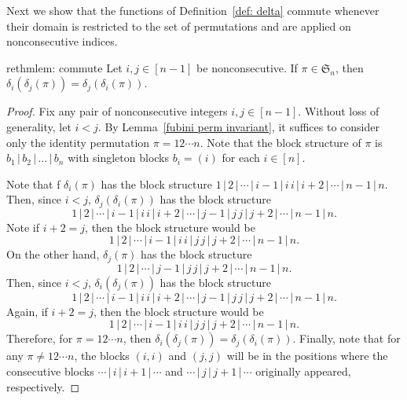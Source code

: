 \documentclass[11pt,reqno]{amsart}
\theoremstyle{definition}
\theoremstyle{notation}
\theoremstyle{openproblem}
\newcommand{\Sym}{\mathfrak{S}}
\begin{document}
Next we show that the functions of Definition~\ref{def: delta} commute whenever their domain is restricted to the set of permutations and are applied on nonconsecutive indices.
\begin{restatable}{rethm}{lem: commute}
\label{lem: commute}
Let  $i , j \in [n-1]$ be nonconsecutive. If $\pi \in \Sym_n$, then $\delta_i(\delta_j(\pi)) = \delta_j(\delta_i(\pi))$.
\end{restatable}
\begin{proof}
Fix any pair of nonconsecutive integers $i, j \in [n-1]$. 
Without loss of generality, let $i<j$.
By Lemma~\ref{fubini perm invariant}, it suffices to consider only the identity permutation $\pi = 12\cdots n$. 
Note that the block structure of $\pi$ is $b_1 \,|\, b_2 \,|\, \ldots \,|\, b_n$ with singleton blocks $b_i = (i)$ for each $i \in [n]$.

Note that f $\delta_i(\pi)$ has the block structure $1\,|\,2\,|\,\cdots\,|\,i-1\,|\,i\,i\,|\,i+2\,|\,\cdots\,|\,n-1\,|\,n$. 
Then, since $i < j$, $\delta_j(\delta_i(\pi))$ has the block structure
\[
1\,|\,2\,|\,\cdots\,|\,i-1\,|\,i\,i\,|\,i+2\,|\,\cdots\,|\,j-1\,|\,j\,j\,|\,j+2\,|\,\cdots\,|\,n-1\,|\,n.
\] 
Note if $i+2=j$, then the block structure would be
\[
1\,|\,2\,|\,\cdots\,|\,i-1\,|\,i\,i\,|\,j\,j\,|\,j+2\,|\,\cdots\,|\,n-1\,|\,n.
\]
On the other hand, 
$\delta_j(\pi)$ has the block structure \[1\,|\,2\,|\,\cdots\,|\,j-1\,|\,j\,j\,|\,j+2\,|\,\cdots\,|\,n-1\,|\,n.\] 
Then, since $i < j$, $\delta_i(\delta_j(\pi))$ has the block structure \[1\,|\,2\,|\,\cdots\,|\,i-1\,|\,i\,i\,|\,i+2\,|\,\cdots\,|\,j-1\,|\,j\,j\,|\,j+2\,|\,\cdots\,|\,n-1\,|\,n.\] 
Again, if $i+2=j$, then the block structure would be
\[1\,|\,2\,|\,\cdots\,|\,i-1\,|\,i\,i\,|\,j\,j\,|\,j+2\,|\,\cdots\,|\,n-1\,|\,n.\]
Therefore, for $\pi = 12\cdots n$, then $\delta_i(\delta_j(\pi)) = \delta_j(\delta_i(\pi))$. 
Finally, note that for any $\pi \neq 12\cdots n$, the blocks $(i,i)$ and $(j,j)$ will be in the positions where the consecutive blocks $\cdots\,|\,i\,|\,i+1\,|\,\cdots$ and $\cdots\,|\,j\,|\,j+1\,|\,\cdots$ originally appeared, respectively.
\end{proof}
\end{document}
